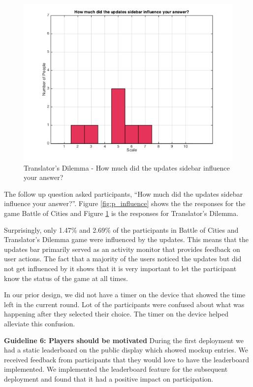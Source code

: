 \documentclass{sig-alternate}
\begin{document}
\begin{figure}
	\includegraphics[width=\linewidth]{t_influence.png}
	\caption{Translator's Dilemma - How much did the updates sidebar influence your answer?}
	\label{fig:t_influence}
\end{figure}

The follow up question asked participants, ``How much did the updates sidebar influence your answer?''. Figure \ref{fig:p_influence} shows the the responses for the game Battle of Cities and Figure \ref{fig:t_influence} is the responses for Translator's Dilemma.

Surprisingly, only 1.47\% and 2.69\% of the participants in Battle of Cities and Translator's Dilemma game were influenced by the updates. This means that the updates bar primarily served as an activity monitor that provides feedback on user actions. The fact that a majority of the users noticed the updates but did not get influenced by it shows that it is very important to let the participant know the status of the game at all times.

In our prior design, we did not have a timer on the device that showed the time left in the current round. Lot of the participants were confused about what was happening after they selected their choice. The timer on the device helped alleviate this confusion.

\textbf{Guideline 6: Players should be motivated}
During the first deployment we had a static leaderboard on the public display which showed mockup entries. We received feedback from participants that they would love to have the leaderboard implemented. We implemented the leaderboard feature for the subsequent deployment and found that it had a positive impact on participation. 
\end{document}
